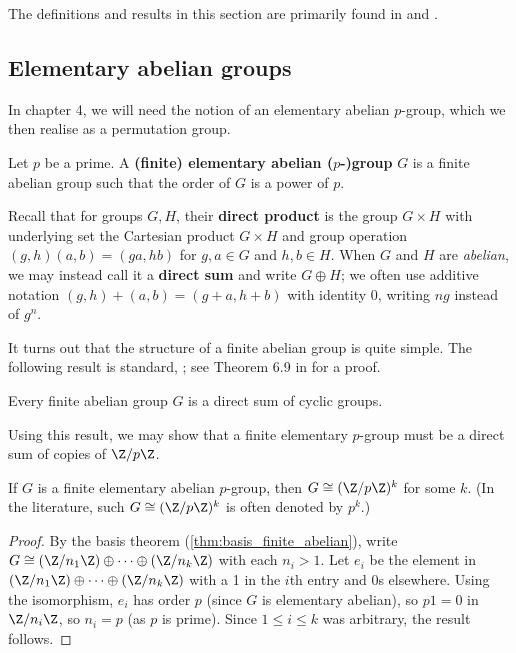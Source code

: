 The definitions and results in this section are primarily found in \cite{rotman_intro_theory_groups1995} and \cite{dixon_mortimer_perm_groups1996}.

\subsection{Elementary abelian groups}

In chapter 4, we will need the notion of an elementary abelian $p$-group, which we then realise as a permutation group.

\begin{definition}\label{def:elem-abelian-group}
    Let $p$ be a prime. A \textbf{(finite) elementary abelian ($p$-)group} $G$ is a finite abelian group such that the order of $G$ is a power of $p$.
\end{definition}

Recall that for groups $G,H$, their \textbf{direct product} is the group $G \times H$ with underlying set the Cartesian product $G \times H$ and group operation $(g,h)(a,b) = (ga,hb)$ for $g,a \in G$ and $h,b \in H$. When $G$ and $H$ are \textit{abelian}, we may instead call it a \textbf{direct sum} and write $G \oplus H$; we often use additive notation $(g,h) + (a,b) = (g+a,h+b)$ with identity $0$, writing $ng$ instead of $g^n$.

It turns out that the structure of a finite abelian group is quite simple. The following result is standard, ; see Theorem 6.9 in \cite{rotman_intro_theory_groups1995} for a proof.

\begin{theorem}\label{thm:basis_finite_abelian}
    Every finite abelian group $G$ is a direct sum of cyclic groups.
\end{theorem}

Using this result, we may show that a finite elementary $p$-group must be a direct sum of copies of $\Z/p\Z$.

\begin{corollary}\label{cor:elementary_abelian_group_form}
    If $G$ is a finite elementary abelian $p$-group, then $G \cong (\Z/p\Z)^k$ for some $k$. (In the literature, such $G \cong (\Z/p\Z)^k$ is often denoted by $p^k$.)
\end{corollary}

\begin{proof}
    By the basis theorem (\autoref{thm:basis_finite_abelian}), write $G \cong (\Z/n_1\Z) \oplus \dotsb \oplus (\Z/n_k\Z)$ with each $n_i > 1$. Let $e_i$ be the element in $(\Z/n_1\Z) \oplus \dotsb \oplus (\Z/n_k\Z)$ with a 1 in the $i$th entry and 0s elsewhere. Using the isomorphism, $e_i$ has order $p$ (since $G$ is elementary abelian), so $p1 = 0$ in $\Z/n_i\Z$, so $n_i = p$ (as $p$ is prime). Since $1 \leq i \leq k$ was arbitrary, the result follows.
\end{proof}

